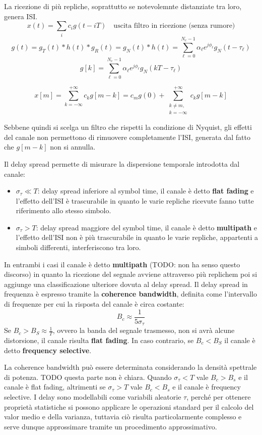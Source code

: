 La ricezione di più repliche, soprattutto se notevolemnte distanziate tra loro, genera ISI.
\[
    x(t) = \sum_{i} c_i g(t - iT) \quad \text{uscita filtro in ricezione (senza rumore)}
\]
\[
    g(t) = g_T(t) \ast h(t) \ast g_R(t) = g_N(t) \ast h(t) = \sum_{\ell=0}^{N_c-1} \alpha_{\ell} e^{j\phi_{\ell}} g_N(t - \tau_{\ell})
\]
\[
    g\left[k\right] = \sum_{\ell=0}^{N_c-1} \alpha_{\ell} e^{j\phi_{\ell}} g_N\left(kT - \tau_{\ell}\right)
\]

\[
    x\left[m\right] = \sum_{k=-\infty}^{+\infty} c_k g\left[m - k \right] = c_m g(0) + \sum_{\substack{k \neq m,\\ k=-\infty}}^{+\infty} c_{k} g\left[m-k\right]
\]


Sebbene quindi si scelga un filtro che rispetti la condizione di Nyquist, gli effetti del canale non permettono di rimuovere completamente l'ISI, generata dal fatto che $g\left[m-k\right]$ non si annulla.


Il delay spread permette di misurare la dispersione temporale introdotta dal canale:
\begin{itemize}
    \item $\sigma_\tau \ll T$: delay spread inferiore al symbol time, il canale è detto \textbf{flat fading}  e l'effetto dell'ISI è trascurabile in quanto le varie repliche ricevute fanno tutte riferimento allo stesso simbolo.
    \item $\sigma_\tau > T$: delay spread maggiore del symbol time, il canale è detto \textbf{multipath} e l'effetto dell'ISI non è più trascurabile in quanto le varie repliche, appartenti a simboli differenti, interferiscono tra loro.
\end{itemize}

In entrambi i casi il canale è detto \textbf{multipath} (TODO: non ha senso questo discorso) in quanto la ricezione del segnale avviene attraverso più replichem poi si aggiunge una classificazione ulteriore dovuta al delay spread.
Il delay spread in frequenza è espresso tramite la \textbf{coherence bandwidth}, definita come l'intervallo di frequenze per cui la risposta del canale è circa costante: 
\[
    B_c \approx \frac{1}{5\sigma_\tau}
\]
Se $B_c > B_S \approx \frac{1}{T}$, ovvero la banda del segnale trasmesso, non si avrà alcune distorsione, il canale risulta \textbf{flat fading}. In caso contrario, se $B_c < B_S$ il canale è detto \textbf{frequency selective}. 

La coherence bandwidth può essere determinata considerando la densità spettrale di potenza.
TODO questa parte non è chiara.
Quando $\sigma_{\tau} < T$ vale $B_c > B_s$ e il canale è flat fading, altrimenti se $\sigma_{\tau} > T$ vale $B_c < B_s$ e il canale è frequency selective.
I delay sono modellabili come variabili aleatorie $\tau$, perché per ottenere proprietà statistiche si possono applicare le operazioni standard per il calcolo del valor medio e della varianza, tuttavia ciò risulta particolarmente complesso e serve dunque approssimare tramite un procedimento approssimativo.


